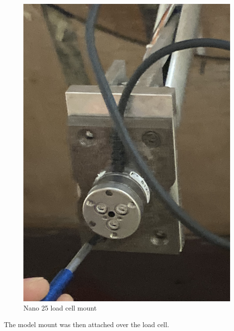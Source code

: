 \begin{figure}[H]
    \centering
    \includegraphics[scale=0.08]{04_Methodology/Figs/loadCellMount}
    \caption{Nano 25 load cell mount}
    \label{fig:LoadCella}
\end{figure}

The model mount was then attached over the load cell. 

